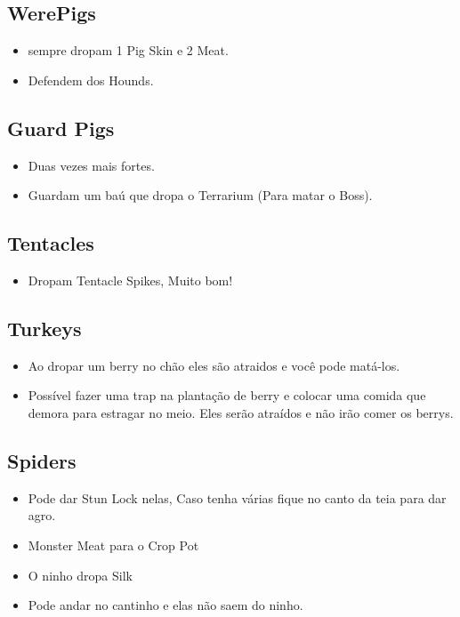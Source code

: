 \documentclass{article}
\begin{document}
\subsection*{WerePigs}
\begin{itemize}
    \item sempre dropam 1 Pig Skin e 2 Meat.
    \item Defendem dos Hounds.
\end{itemize}


\subsection*{Guard Pigs}
\begin{itemize}
    \item Duas vezes mais fortes.
    \item Guardam um baú que dropa o Terrarium (Para matar o Boss).
\end{itemize}


\subsection*{Tentacles}
\begin{itemize}
    \item Dropam Tentacle Spikes, Muito bom!
\end{itemize}

\subsection*{Turkeys}
\begin{itemize}
    \item Ao dropar um berry no chão eles são atraidos e você pode matá-los.
    \item Possível fazer uma trap na plantação de berry e colocar uma comida que demora para estragar no meio. 
    Eles serão atraídos e não irão comer os berrys.
\end{itemize}


\subsection*{Spiders}
\begin{itemize}
    \item Pode dar Stun Lock nelas, Caso tenha várias fique no canto da teia para dar agro.
    \item Monster Meat para o Crop Pot
    \item O ninho dropa Silk
    \item Pode andar no cantinho e elas não saem do ninho.
\end{itemize}
\end{document}
